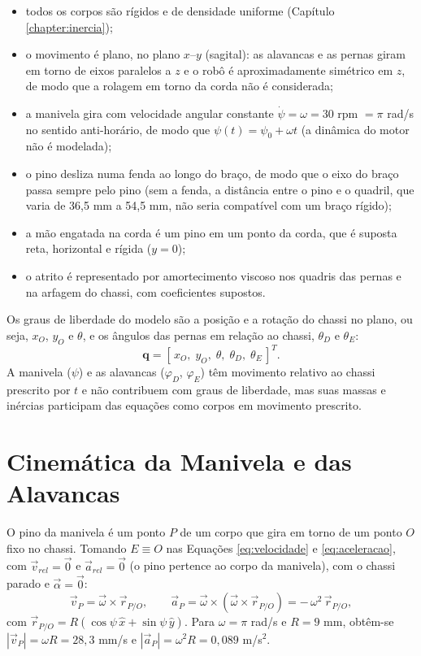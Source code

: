 \begin{itemize}
  \item todos os corpos são rígidos e de densidade uniforme (Capítulo \ref{chapter:inercia});
  \item o movimento é plano, no plano $x$--$y$ (sagital): as alavancas e as pernas giram em torno de eixos paralelos a $z$ e o robô é aproximadamente simétrico em $z$, de modo que a rolagem em torno da corda não é considerada;
  \item a manivela gira com velocidade angular constante $\dot\psi = \omega = 30$ rpm $=\pi$ rad/s no sentido anti-horário, de modo que $\psi(t)=\psi_0+\omega t$ (a dinâmica do motor não é modelada);
  \item o pino desliza numa fenda ao longo do braço, de modo que o eixo do braço passa sempre pelo pino (sem a fenda, a distância entre o pino e o quadril, que varia de 36,5 mm a 54,5 mm, não seria compatível com um braço rígido);
  \item a mão engatada na corda é um pino em um ponto da corda, que é suposta reta, horizontal e rígida ($y=0$);
  \item o atrito é representado por amortecimento viscoso nos quadris das pernas e na arfagem do chassi, com coeficientes supostos.
\end{itemize}

Os graus de liberdade do modelo são a posição e a rotação do chassi no plano, ou seja, $x_O$, $y_O$ e $\theta$, e os ângulos das pernas em relação ao chassi, $\theta_D$ e $\theta_E$:
\begin{equation}
  \mathbf{q} = [\,x_O,\; y_O,\; \theta,\; \theta_D,\; \theta_E\,]^T .
  \label{eq:coordenadas}
\end{equation}
A manivela ($\psi$) e as alavancas ($\varphi_D$, $\varphi_E$) têm movimento relativo ao chassi prescrito por $t$ e não contribuem com graus de liberdade, mas suas massas e inércias participam das equações como corpos em movimento prescrito.

\section{Cinemática da Manivela e das Alavancas}
\label{sec:alavancas}

O pino da manivela é um ponto $P$ de um corpo que gira em torno de um ponto $O$ fixo no chassi. Tomando $E\equiv O$ nas Equações \ref{eq:velocidade} e \ref{eq:aceleracao}, com $\vec{v}_{rel}=\vec{0}$ e $\vec{a}_{rel}=\vec{0}$ (o pino pertence ao corpo da manivela), com o chassi parado e $\vec\alpha=\vec 0$:
\begin{equation}
  \vec{v}_P = \vec{\omega}\times\vec{r}_{P/O}, \qquad
  \vec{a}_P = \vec{\omega}\times(\vec{\omega}\times\vec{r}_{P/O}) = -\,\omega^{2}\,\vec{r}_{P/O},
  \label{eq:pino}
\end{equation}
com $\vec r_{P/O}=R(\cos\psi\,\hat{x}+\sin\psi\,\hat{y})$. Para $\omega=\pi$ rad/s e $R=9$ mm, obtêm-se $|\vec v_P| = \omega R = 28,3$ mm/s e $|\vec a_P| = \omega^2 R = 0,089$ m/s$^2$.

